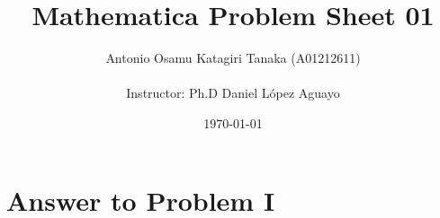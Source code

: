 \documentclass[11pt,a4paper]{article}
\title
{
    Mathematica Problem Sheet 01
}
\author
{    
    Antonio Osamu Katagiri Tanaka (A01212611) \\
    \\
    Instructor: Ph.D Daniel L{\' o}pez Aguayo
}
\date{\today}
\providecommand{\keywords}[1]
{
    \\
    \\
    \small
    \textbf{\textit{Keywords:}} #1
}
\begin{document}
\setlength\parindent{0pt} %


\maketitle


\clearpage








\section{Answer to Problem I}\label{sec:P01}

%
\end{document}
